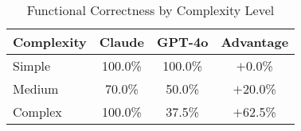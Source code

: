 \begin{table}[h]
\centering
\caption{Functional Correctness by Complexity Level}
\begin{tabular}{l|c|c|c}
\hline
\textbf{Complexity} & \textbf{Claude} & \textbf{GPT-4o} & \textbf{Advantage} \\
\hline
Simple & 100.0\% & 100.0\% & $+$0.0\% \\
Medium & 70.0\% & 50.0\% & $+$20.0\% \\
Complex & 100.0\% & 37.5\% & $+$62.5\% \\
\hline
\end{tabular}
\end{table}
